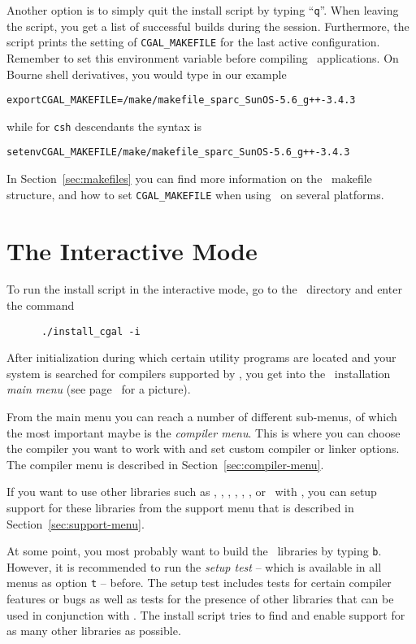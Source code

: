 Another option is to simply quit the install script by typing
``\texttt{q}''. When leaving the script, you get a list of successful
builds during the session.  Furthermore, the script prints the setting
of \texttt{CGAL\_MAKEFILE} for the last active configuration. Remember
to set this environment variable before compiling \cgal\ applications.
On Bourne shell derivatives, you would type in our example
\begin{alltt}
      export CGAL_MAKEFILE=\cgaldir/make/makefile_sparc_SunOS-5.6_g++-3.4.3
\end{alltt}
while for \texttt{csh} descendants the syntax is
\begin{alltt}
      setenv CGAL_MAKEFILE \cgaldir/make/makefile_sparc_SunOS-5.6_g++-3.4.3
\end{alltt}
In Section~\ref{sec:makefiles} you can find more information on the
\cgal\ makefile structure, and how to set \texttt{CGAL\_MAKEFILE} when
using \cgal\ on several platforms.

\section{The Interactive Mode\label{sec:interactive-mode}}

To run the install script in the interactive mode, go to the \cgaldir\
directory and enter the command
\begin{verbatim}
      ./install_cgal -i
\end{verbatim}

After initialization during which certain utility programs are located
and your system is searched for compilers supported by \cgal, you get
into the \cgal\ installation \textit{main menu} (see
page~\pageref{pic:main-menu} for a picture).

From the main menu you can reach a number of different sub-menus, of
which the most important maybe is the \textit{compiler menu}. This is
where you can choose the compiler you want to work with and set custom
compiler or linker options. The compiler menu is described in
Section~\ref{sec:compiler-menu}.

If you want to use other libraries such as \boost, \taucs, \gmp,
\mpfr, \core, \leda, or \qt\ with \cgal, you can setup support for
these libraries from the support menu that is described in
Section~\ref{sec:support-menu}.

At some point, you most probably want to build the \cgal\ libraries by
typing \texttt{b}. However, it is recommended to run the \textit{setup
  test} -- which is available in all menus as option \texttt{t} --
before. The setup test includes tests for certain compiler features or
bugs as well as tests for the presence of other libraries that can be
used in conjunction with \cgal. The install script tries to find and
enable support for as many other libraries as possible.

